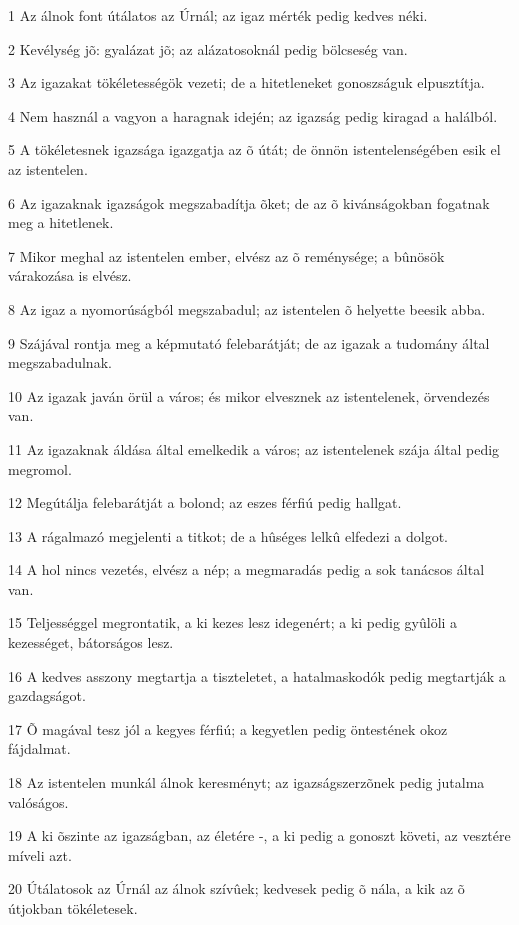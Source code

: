 \par 1 Az álnok font útálatos az Úrnál; az igaz mérték pedig kedves néki.
\par 2 Kevélység jõ: gyalázat jõ; az alázatosoknál pedig bölcseség van.
\par 3 Az igazakat tökéletességök vezeti; de a hitetleneket gonoszságuk elpusztítja.
\par 4 Nem használ a vagyon a haragnak idején; az igazság pedig kiragad a halálból.
\par 5 A tökéletesnek igazsága igazgatja az õ útát; de önnön istentelenségében esik el az istentelen.
\par 6 Az igazaknak igazságok megszabadítja õket; de az õ kivánságokban fogatnak meg  a hitetlenek.
\par 7 Mikor meghal az istentelen ember, elvész az õ reménysége; a bûnösök várakozása is elvész.
\par 8 Az igaz a nyomorúságból megszabadul; az istentelen õ helyette beesik abba.
\par 9 Szájával rontja meg a képmutató felebarátját; de az igazak a tudomány által megszabadulnak.
\par 10 Az igazak javán örül a város; és mikor elvesznek az istentelenek, örvendezés van.
\par 11 Az igazaknak áldása által emelkedik a város; az istentelenek szája által pedig megromol.
\par 12 Megútálja felebarátját a bolond; az eszes férfiú pedig hallgat.
\par 13 A rágalmazó megjelenti a titkot; de a hûséges lelkû elfedezi a dolgot.
\par 14 A hol nincs vezetés, elvész a nép; a megmaradás pedig a sok tanácsos által van.
\par 15 Teljességgel megrontatik, a ki kezes lesz idegenért; a ki pedig gyûlöli a kezességet, bátorságos lesz.
\par 16 A kedves asszony megtartja a tiszteletet, a hatalmaskodók pedig megtartják a gazdagságot.
\par 17 Õ magával tesz jól a kegyes férfiú; a kegyetlen pedig öntestének okoz fájdalmat.
\par 18 Az istentelen munkál álnok keresményt; az igazságszerzõnek pedig jutalma valóságos.
\par 19 A ki õszinte az igazságban, az életére -, a ki pedig a gonoszt követi, az vesztére míveli azt.
\par 20 Útálatosok az Úrnál az álnok szívûek; kedvesek pedig õ nála, a kik az õ útjokban tökéletesek.
